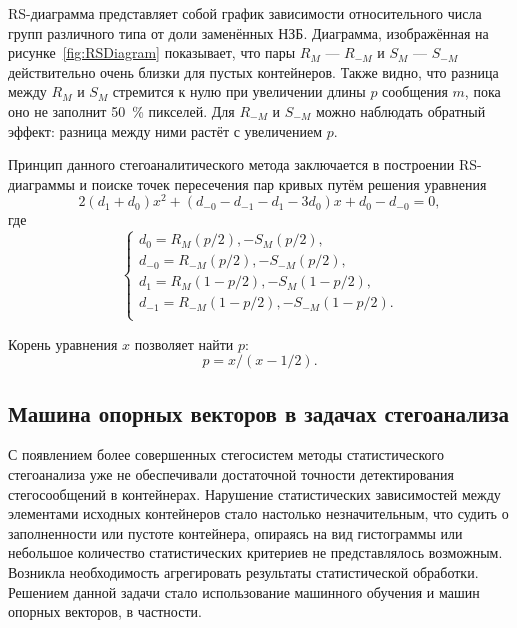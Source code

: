RS-диаграмма представляет собой график зависимости относительного числа групп различного типа от доли заменённых НЗБ. Диаграмма, изображённая на рисунке~\ref{fig:RSDiagram} показывает, что пары $ R_M $ --- $ R_{-M} $ и $ S_M $ --- $ S_{-M} $ действительно очень близки для пустых контейнеров. Также видно, что разница между $ R_M $  и $ S_M $ стремится к нулю при увеличении длины $ p $ сообщения $ m $, пока оно не заполнит 50~\% пикселей. Для $ R_{-M} $ и $ S_{-M} $ можно наблюдать обратный эффект: разница между ними растёт с увеличением $ p $.

Принцип данного стегоаналитического метода заключается в построении RS-диаграммы и поиске точек пересечения пар кривых путём решения уравнения
\begin{equation*}
2(d_1 + d_0)x^2 + (d_{-0} - d_{-1} - d_1 - 3{d_0})x + d_0 - d_{-0} = 0,
\end{equation*}
где
\begin{equation*}
\begin{cases}
d_0 = R_M(p/2), - S_M(p/2), \\
d_{-0} = R_{-M}(p/2), - S_{-M}(p/2), \\
d_1 = R_M(1 - p/2), - S_M(1 - p/2), \\
d_{-1} = R_{-M}(1 - p/2), - S_{-M}(1 - p/2). \\
\end{cases}
\end{equation*}

Корень уравнения $ x $ позволяет найти $ p $:
\begin{equation*}
p = x/(x - 1/2).
\end{equation*}

\subsection{Машина опорных векторов в задачах стегоанализа}

С появлением более совершенных стегосистем методы статистического стегоанализа уже не обеспечивали достаточной точности детектирования стегосообщений в контейнерах. Нарушение статистических зависимостей между элементами исходных контейнеров стало настолько незначительным, что судить о заполненности или пустоте контейнера, опираясь на вид гистограммы или небольшое количество статистических критериев не представлялось возможным. Возникла необходимость агрегировать результаты статистической обработки. Решением данной задачи стало использование машинного обучения и машин опорных векторов, в частности.

